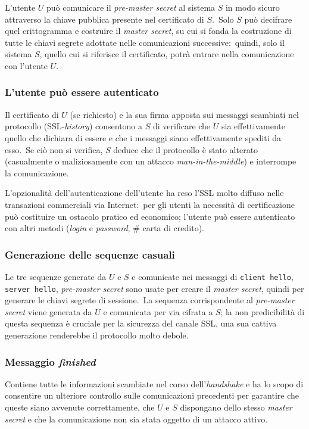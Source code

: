 L'utente $U$ può comunicare il \textit{pre-master secret} al sistema $S$ in modo sicuro attraverso la chiave pubblica presente nel certificato di $S$.\
Solo $S$ può decifrare quel crittogramma e costruire il \textit{master secret}, su cui si fonda la costruzione di tutte le chiavi segrete adottate nelle comunicazioni successive:\ quindi, solo il sistema $S$, quello cui si riferisce il certificato, potrà entrare nella comunicazione con l'utente $U$.\

\subsubsection{L'utente può essere autenticato}

Il certificato di $U$ (se richiesto) e la sua firma apposta sui messaggi scambiati nel protocollo (SSL-\textit{history}) consentono a $S$ di verificare che $U$ sia effettivamente quello che dichiara di essere e che i messaggi siano effettivamente spediti da esso.\
Se ciò non si verifica, $S$ deduce che il protocollo è stato alterato (casualmente o maliziosamente con un attacco \textit{man-in-the-middle}) e interrompe la comunicazione.\

L'opzionalità dell'autenticazione dell'utente ha reso l'SSL molto diffuso nelle transazioni commerciali via Internet:\ per gli utenti la necessità di certificazione può costituire un ostacolo pratico ed economico; l'utente può essere autenticato con altri metodi (\textit{login} e \textit{password}, \# carta di credito).\

\subsubsection{Generazione delle sequenze casuali}

Le tre sequenze generate da $U$ e $S$ e comunicate nei messaggi di \texttt{client hello}, \texttt{server hello}, \textit{pre-master secret} sono usate per creare il \textit{master secret}, quindi per generare le chiavi segrete di sessione.\
La sequenza corrispondente al \textit{pre-master secret} viene generata da $U$ e comunicata per via cifrata a $S$; la non predicibilità di questa sequenza è cruciale per la sicurezza del canale SSL, una sua cattiva generazione renderebbe il protocollo molto debole.\

\subsubsection{Messaggio \textit{finished}}

Contiene tutte le informazioni scambiate nel corso dell'\textit{handshake} e ha lo scopo di consentire un ulteriore controllo sulle comunicazioni precedenti per garantire che queste siano avvenute correttamente, che $U$ e $S$ dispongano dello stesso \textit{master secret} e che la comunicazione non sia stata oggetto di un attacco attivo.\
